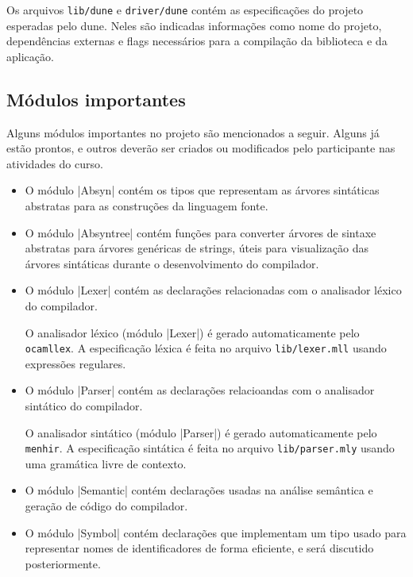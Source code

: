 \documentclass[a4paper,11pt,brazil]{article}
\begin{document}
Os arquivos \texttt{lib/dune} e \texttt{driver/dune} contém as
especificações do projeto esperadas pelo dune. Neles são indicadas
informações como nome do projeto, dependências externas e flags
necessários para a compilação da biblioteca e da aplicação.

\subsection{Módulos importantes}

Alguns módulos importantes no projeto são mencionados a seguir. Alguns
já estão prontos, e outros deverão ser criados ou modificados pelo
participante nas atividades do curso.

\begin{itemize}
  \item O módulo \pyginline|Absyn| contém os tipos que representam as
  árvores sintáticas abstratas para as construções da linguagem fonte.

  \item O módulo \pyginline|Absyntree| contém funções para converter
  árvores de sintaxe abstratas para árvores genéricas de strings,
  úteis para visualização das árvores sintáticas durante o
  desenvolvimento do compilador.

  \item O módulo \pyginline|Lexer| contém as declarações relacionadas
  com o analisador léxico do compilador.

  O analisador léxico (módulo \pyginline|Lexer|) é gerado
  automaticamente pelo \texttt{ocamllex}. A especificação léxica é
  feita no arquivo \texttt{lib/lexer.mll} usando expressões
  regulares.

  \item O módulo \pyginline|Parser| contém as declarações relacioandas
  com o analisador sintático do compilador.

  O analisador sintático (módulo \pyginline|Parser|) é gerado
  automaticamente pelo \texttt{menhir}. A especificação sintática é
  feita no arquivo \texttt{lib/parser.mly} usando uma gramática
  livre de contexto.
  
  \item O módulo \pyginline|Semantic| contém declarações usadas na
  análise semântica e geração de código do compilador.

  \item O módulo \pyginline|Symbol| contém declarações que implementam
  um tipo usado para representar nomes de identificadores de forma
  eficiente, e será discutido posteriormente.


\end{itemize}
\end{document}

